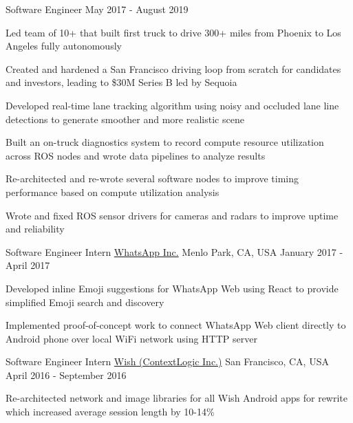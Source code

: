 \begin{center}
  \cvsubentry
    {Software Engineer}
    {May 2017 - August 2019}
    {
      \begin{cvitems}
        \item {Led team of 10+ that built first truck to drive 300+ miles from Phoenix to Los Angeles fully autonomously}
        \item {Created and hardened a San Francisco driving loop from scratch for candidates and investors, leading to \$30M Series B led by Sequoia}
        \item {Developed real-time lane tracking algorithm using noisy and occluded lane line detections to generate smoother and more realistic scene}
        \item {Built an on-truck diagnostics system to record compute resource utilization across ROS nodes and wrote data pipelines to analyze results}
        \item {Re-architected and re-wrote several software nodes to improve timing performance based on compute utilization analysis}
        \item {Wrote and fixed ROS sensor drivers for cameras and radars to improve uptime and reliability}
      \end{cvitems} 
    }
\end{center}
\begin{center}
  \vspace{-2.7mm}
  \cventry
    {Software Engineer Intern}
    {\href{http://web.whatsapp.com/}{WhatsApp Inc.}}
    {Menlo Park, CA, USA}
    {January 2017 - April 2017}
    {
      \begin{cvitems}
        \item {Developed inline Emoji suggestions for WhatsApp Web using React to provide simplified Emoji search and discovery}
        \item {Implemented proof-of-concept work to connect WhatsApp Web client directly to Android phone over local WiFi network using HTTP server}
      \end{cvitems}
    }
\end{center}
\begin{center}
  \vspace{-2.7mm}
  \cventry
    {Software Engineer Intern}
    {\href{http://wish.com/mobile-apps}{Wish (ContextLogic Inc.)}}
    {San Francisco, CA, USA}
    {April 2016 - September 2016}
    {
      \begin{cvitems}
        \item {Re-architected network and image libraries for all Wish Android apps for rewrite which increased average session length by 10-14\%}
      \end{cvitems}
    }
\end{center}
